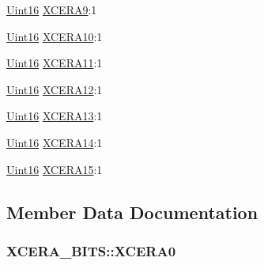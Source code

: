 \begin{DoxyCompactItemize}
\item 
\hyperlink{_d_s_p2833x___device_8h_a59a9f6be4562c327cbfb4f7e8e18f08b}{Uint16} \hyperlink{struct_x_c_e_r_a___b_i_t_s_a766ce7bdc0e695ff38e65b9b1967cfbe}{X\+C\+E\+R\+A9}\+:1
\item 
\hyperlink{_d_s_p2833x___device_8h_a59a9f6be4562c327cbfb4f7e8e18f08b}{Uint16} \hyperlink{struct_x_c_e_r_a___b_i_t_s_af7ef50f29e1d16f0f075eb1d4cc8252a}{X\+C\+E\+R\+A10}\+:1
\item 
\hyperlink{_d_s_p2833x___device_8h_a59a9f6be4562c327cbfb4f7e8e18f08b}{Uint16} \hyperlink{struct_x_c_e_r_a___b_i_t_s_a9c1b06e4f306e5fc9681020f4d815dae}{X\+C\+E\+R\+A11}\+:1
\item 
\hyperlink{_d_s_p2833x___device_8h_a59a9f6be4562c327cbfb4f7e8e18f08b}{Uint16} \hyperlink{struct_x_c_e_r_a___b_i_t_s_af977fa387df779e23de5fa41c21cd7ed}{X\+C\+E\+R\+A12}\+:1
\item 
\hyperlink{_d_s_p2833x___device_8h_a59a9f6be4562c327cbfb4f7e8e18f08b}{Uint16} \hyperlink{struct_x_c_e_r_a___b_i_t_s_a16d8406df0482fea5a4629138825faff}{X\+C\+E\+R\+A13}\+:1
\item 
\hyperlink{_d_s_p2833x___device_8h_a59a9f6be4562c327cbfb4f7e8e18f08b}{Uint16} \hyperlink{struct_x_c_e_r_a___b_i_t_s_ae479a6af853b26b09cf0d100b3a9028b}{X\+C\+E\+R\+A14}\+:1
\item 
\hyperlink{_d_s_p2833x___device_8h_a59a9f6be4562c327cbfb4f7e8e18f08b}{Uint16} \hyperlink{struct_x_c_e_r_a___b_i_t_s_a7763bae0737af48a0b1b4c6daa85bbe5}{X\+C\+E\+R\+A15}\+:1
\end{DoxyCompactItemize}


\subsection{Member Data Documentation}
\hypertarget{struct_x_c_e_r_a___b_i_t_s_affe74fd63be2261d18c675c831514f7d}{}
\subsubsection[{X\+C\+E\+R\+A0}]{ X\+C\+E\+R\+A\+\_\+\+B\+I\+T\+S\+::\+X\+C\+E\+R\+A0}\label{struct_x_c_e_r_a___b_i_t_s_affe74fd63be2261d18c675c831514f7d}
\hypertarget{struct_x_c_e_r_a___b_i_t_s_a38c83387da8ba9a14e437f88b74fef4f}{}
